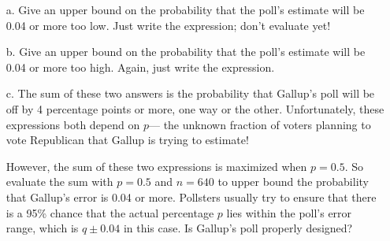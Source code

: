 \documentclass[12pt]{article}
\begin{document}
\begin{itemize}

\item[a.] Give an upper bound on the probability that the poll's estimate
will be 0.04 or more too low.  Just write the expression; don't evaluate
yet!


\item[b.] Give an upper bound on the probability that the poll's estimate
will be 0.04 or more too high.  Again, just write the expression.


\item[c.] The sum of these two answers is the probability that Gallup's poll
will be off by 4 percentage points or more, one way or the other.
Unfortunately, these expressions both depend on $p$--- the unknown
fraction of voters planning to vote Republican that Gallup is trying to estimate!

However, the sum of these two expressions is maximized when $p = 0.5$.  So
evaluate the sum with $p = 0.5$ and $n = 640$ to upper bound the
probability that Gallup's error is 0.04 or more.  Pollsters usually try to
ensure that there is a 95\% chance that the actual percentage $p$ lies
within the poll's error range, which is $q \pm 0.04$ in this case.  Is
Gallup's poll properly designed?


\end{itemize}
\end{document}
